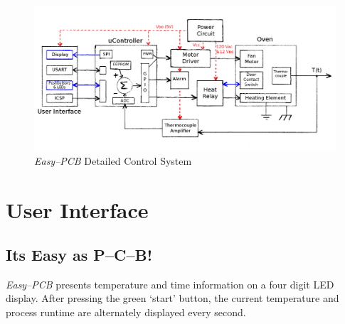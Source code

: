 \documentclass[10pt, twocolumn]{article}
\begin{document}
\begin{figure}
	\centering
	\includegraphics[width=\textwidth]{Figures/detailed-system-diagram.png}
	\caption{\emph{Easy--PCB} Detailed Control System}
	\label{detailed-system-diagram}
\end{figure}

\pagebreak
\tableofcontents

\pagebreak
\section{User Interface}
\subsection{Its Easy as P--C--B!}

\emph{Easy--PCB} presents temperature and time information on a four digit LED display.
After pressing the green `start' button, the current temperature and process
runtime are alternately displayed every second.
\end{document}
